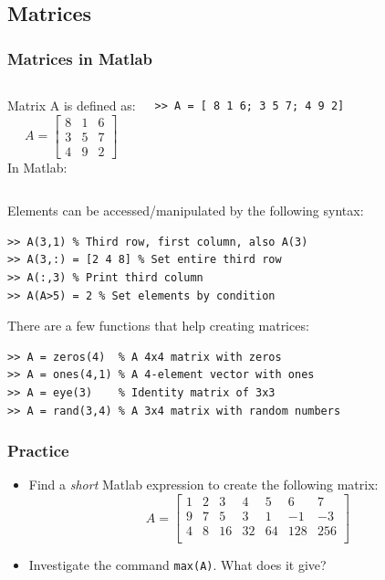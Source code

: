 \documentclass[11pt,table,final,fleqn,xcolor={usenames,dvipsnames},unknownkeysallowed,handout]{beamer}
\begin{document}
\subsection*{Matrices}
\begin{frame}[fragile]
  \frametitle{Matrices in Matlab}
  \begin{columns}[T]
    Matrix A is defined as:
    \[
    A = \begin{bmatrix}
      8 & 1 & 6 \\
      3 & 5 & 7 \\
      4 & 9 & 2
    \end{bmatrix}\]
    \pause
    In Matlab:
  \begin{lstlisting}
>> A = [ 8 1 6; 3 5 7; 4 9 2]
  \end{lstlisting}
  \end{columns}
  \pause
  Elements can be accessed/manipulated by the following syntax:
  \begin{lstlisting}
>> A(3,1) % Third row, first column, also A(3)
>> A(3,:) = [2 4 8] % Set entire third row
>> A(:,3) % Print third column
>> A(A>5) = 2 % Set elements by condition
  \end{lstlisting}\pause
  There are a few functions that help creating matrices:
  \begin{lstlisting}
>> A = zeros(4)  % A 4x4 matrix with zeros
>> A = ones(4,1) % A 4-element vector with ones
>> A = eye(3)    % Identity matrix of 3x3
>> A = rand(3,4) % A 3x4 matrix with random numbers
  \end{lstlisting}
\end{frame}

\begin{frame}[fragile]
 \frametitle{Practice}
 \begin{itemize}
  \item Find a \emph{short} Matlab expression to create the following matrix:
  \[
   A = \begin{bmatrix}
        1 & 2 & 3 & 4 & 5 & 6 & 7\\
        9 & 7 & 5 & 3 & 1 & -1 & -3 \\
        4 & 8 & 16 & 32 & 64 & 128 & 256 \\
       \end{bmatrix}
  \]\pause
  \item Investigate the command \lstinline$max(A)$. What does it give?
 \end{itemize}
\end{frame}
\end{document}
